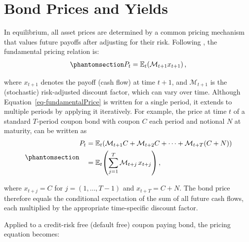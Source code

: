 \documentclass[
  letterpaper,
  DIV=11,
  numbers=noendperiod]{scrreprt}
\begin{document}

\chapter{Bond Prices and Yields}\label{bond-prices-and-yields}

In equilibrium, all asset prices are determined by a common pricing
mechanism that values future payoffs after adjusting for their risk.
Following , the fundamental pricing relation is:
\begin{equation}\protect\phantomsection\label{eq-fundamentalPrice}{  
\begin{align}
    P_t = \mathbb{E}_t\!\left( \mathcal{M}_{t+1} x_{t+1}\right),
\end{align}
}\end{equation}

where \(x_{t+1}\) denotes the payoff (cash flow) at time \(t+1\), and
\(\mathcal{M}_{t+1}\) is the (stochastic) risk‑adjusted discount factor,
which can vary over time. Although Equation~\ref{eq-fundamentalPrice} is
written for a single period, it extends to multiple periods by applying
it iteratively. For example, the price at time \(t\) of a standard
\(T\)-period coupon bond with coupon \(C\) each period and notional
\(N\) at maturity, can be written as
\begin{equation}\protect\phantomsection\label{eq-gen-0026}{  
\begin{align}
P_t 
  &= \mathbb{E}_t\!\left( \mathcal{M}_{t+1} C 
    + \mathcal{M}_{t+2} C 
    + \cdots 
    + \mathcal{M}_{t+T} (C + N) \right) \\
  &= \mathbb{E}_t\!\left( \sum_{j=1}^{T} \mathcal{M}_{t+j} \, x_{t+j} \right),
\end{align}
}\end{equation}

where \(x_{t+j} = C\) for \(j=(1,\ldots,T-1)\) and \(x_{t+T} = C+N\).
The bond price therefore equals the conditional expectation of the sum
of all future cash flows, each multiplied by the appropriate
time-specific discount factor.

Applied to a credit-risk free (default free) coupon paying bond, the
pricing equation becomes:
\end{document}
